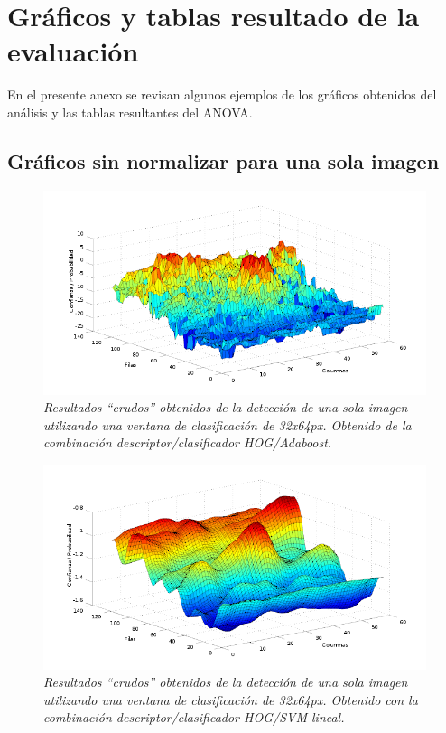 \chapter{Gráficos y tablas resultado de la evaluación}
\label{cap:gre}

En el presente anexo se revisan algunos ejemplos de los gráficos obtenidos del análisis y las tablas resultantes del ANOVA.

\section{Gráficos sin normalizar para una sola imagen}

\begin{figure}[htc]
  \centering
  \includegraphics[scale=.6]{images/raw/boost/prueba2}
  \caption{\em  Resultados ``crudos'' obtenidos de la detección de una sola imagen utilizando una ventana de clasificación de 32x64px. Obtenido de la combinación descriptor/clasificador HOG/Adaboost.}  
  \label{fig:gsn1}
\end{figure}

\begin{figure}[htc]
  \centering
  \includegraphics[scale=.6]{images/raw/svm/prueba2}
  \caption{\em  Resultados ``crudos'' obtenidos de la detección de una sola imagen utilizando una ventana de clasificación de 32x64px. Obtenido con la combinación descriptor/clasificador HOG/SVM lineal.}  
  \label{fig:gsn2}
\end{figure}

